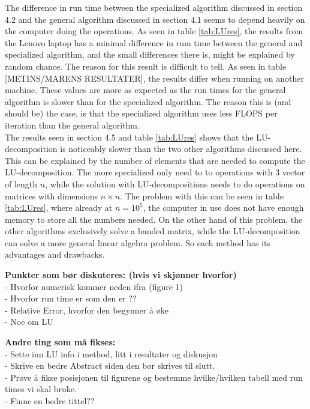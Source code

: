 \documentclass[a4paper,10pt]{article}
\begin{document}
The difference in run time between the specialized algorithm discussed in section 4.2 and the general algorithm discussed in section 4.1 seems to depend heavily on the computer doing the operations. As seen in table \ref{tab:LUres}, the results from the Lenovo laptop has a minimal difference in rum time between the general and specialized algorithm, and the small differences there is, might be explained by random chance. The reason for this result is difficult to tell. As seen in table [METINS/MARENS RESULTATER], the results differ when running on another machine. These values are more as expected as the run times for the general algorithm is slower than for the specialized algorithm. The reason this is (and should be) the case, is that the specialized algorithm uses less FLOPS per iteration than the general algorithm.\\


The results seen in section 4.5 and table \ref{tab:LUres} shows that the LU-decomposition is noticeably slower than the two other algorithms discussed here. This can be explained by the number of elements that are needed to compute the LU-decomposition. The more specialized only need to to operations with 3 vector of length $n$, while the solution with LU-decompositions needs to do operations on matrices with dimensions $n\times n$. The problem with this can be seen in table \ref{tab:LUres}, where already at $n = 10^5$, the computer in use does not have enough memory to store all the numbers needed. On the other hand of this problem, the other algorithms exclusively solve a banded matrix, while the LU-decomposition can solve a more general linear algebra problem. So each method has its advantages and drawbacks.

\bigskip

\textbf{Punkter som bør diskuteres: (hvis vi skjønner hvorfor)}\\
- Hvorfor numerisk kommer neden ifra (figure 1)\\
- Hvorfor run time er som den er ?\checkmark?\\
- Relative Error, hvorfor den begynner å øke \checkmark\\
- Noe om LU \checkmark
\bigskip

\textbf{Andre ting som må fikses:}\\
- Sette inn LU info i method, litt i resultater og diskusjon \checkmark \\
- Skrive en bedre Abstract siden den bør skrives til slutt.\\
- Prøve å fikse posisjonen til figurene og bestemme hvilke/hvilken tabell med run times vi skal bruke.\\
- Finne en bedre tittel??
\end{document}
